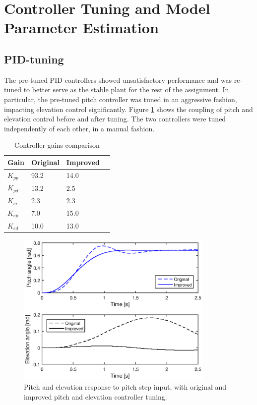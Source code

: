 \section{Controller Tuning and Model Parameter Estimation}\label{sec:prob1}
\label{text:problem1}

\subsection{PID-tuning}
The pre-tuned PID controllers showed unsatisfactory performance and was re-tuned to better serve as the stable plant for the rest of the assignment. In particular, the pre-tuned pitch controller was tuned in an aggressive fashion, impacting elevation control significantly. Figure \ref{fig:pid_tuning} shows the coupling of pitch and elevation control before and after tuning. The two controllers were tuned independently of each other, in a manual fashion.

\begin{table}[hp]
	\centering
	\caption{Controller gains comparison}
	\begin{tabular}{llll}
		\hline
		Gain & Original & Improved \\
		\hline
		$K_{pp}$ & 93.2 & 14.0 \\
		$K_{pd}$ & 13.2 & 2.5 \\
		$K_{ei}$ & 2.3 & 2.3 \\
		$K_{ep}$ & 7.0 & 15.0 \\
		$K_{ed}$ & 10.0 & 13.0 \\
	\end{tabular}
	\label{tab:gains}
\end{table}

\begin{figure}[hp]
	\centering
		\includegraphics[width=0.85\textwidth]{figures/1/pid_tuning.eps}
	\caption{Pitch and elevation response to pitch step input, with original and improved pitch and elevation controller tuning.}
	\label{fig:pid_tuning}
\end{figure}


